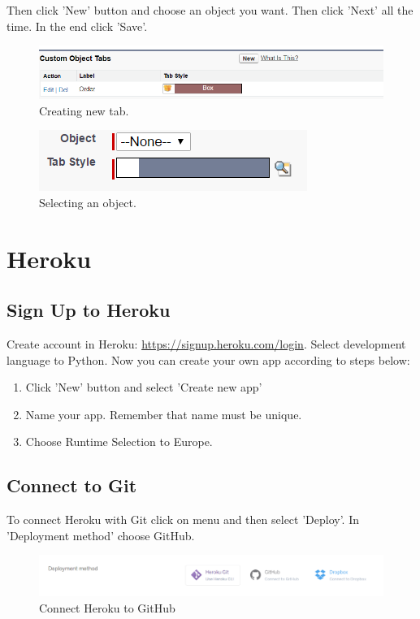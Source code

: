 \documentclass[12pt,a4paper]{article}
\begin{document}
Then click 'New' button and choose an object you want. Then click 'Next' all the time. In the end click 'Save'.

\begin{figure}[H]
	\centering
	\includegraphics{images/create.PNG}
	\caption{Creating new tab.}
	\label{fig:tabb}
\end{figure}

\begin{figure}[H]
	\centering
	\includegraphics{images/tabobj.PNG}
	\caption{Selecting an object.}
	\label{fig:tabbb}
\end{figure}
 
\section{Heroku}
\subsection{Sign Up to Heroku}
Create account in Heroku: \url{https://signup.heroku.com/login}. Select development language to Python. 
Now you can create your own app according to steps below:

\begin{enumerate}
	\item Click 'New' button and select 'Create new app'
	\item Name your app. Remember that name must be unique.
	\item Choose Runtime Selection to Europe. 
\end{enumerate}

\subsection{Connect to Git}
To connect Heroku with Git click on menu and then select 'Deploy'. In 'Deployment method' choose GitHub.
\begin{figure}[H]
	\centering
	\includegraphics[width = 1 \textwidth]{images/git.PNG}
	\caption{Connect Heroku to GitHub}
	\label{fig:git}
\end{figure}
\end{document}
